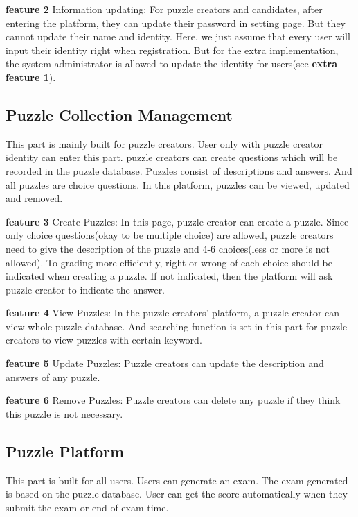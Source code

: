 \documentclass{article}
\begin{document}
 \textbf{feature 2} Information updating: For puzzle creators and candidates, after entering the platform, they can update their password in setting page. But they cannot update their name and identity. Here, we just assume that every user will input their identity right when registration. But for the extra implementation, the system administrator is allowed to update the identity for users(see \textbf{extra feature 1}).


\subsection{Puzzle Collection Management}
This part is mainly built for puzzle creators. User only with puzzle creator identity can enter this part. puzzle creators can create questions which will be recorded in the puzzle database. Puzzles consist of descriptions and answers. And all puzzles are choice questions. In this platform, puzzles can be viewed, updated and removed.

 \textbf{feature 3} Create Puzzles:
In this page, puzzle creator can create a puzzle. Since only choice questions(okay to be multiple choice) are allowed, puzzle creators need to give the description of the puzzle and 4-6 choices(less or more is not allowed). To grading more efficiently, right or wrong of each choice should be indicated when creating a puzzle. If not indicated, then the platform will ask puzzle creator to indicate the answer.

 \textbf{feature 4} View Puzzles: 
In the puzzle creators' platform, a puzzle creator can view whole puzzle database. And searching function is set in this part for puzzle creators to view puzzles with certain keyword.

 \textbf{feature 5} Update Puzzles: 
 Puzzle creators can update the description and answers of any puzzle. 

 \textbf{feature 6} Remove Puzzles:
Puzzle creators can delete any puzzle if they think this puzzle is not necessary.

\subsection{Puzzle Platform}
This part is built for all users. Users can generate an exam. The exam generated is based on the puzzle database. User can get the score automatically when they submit the exam or end of exam time.
\end{document}
